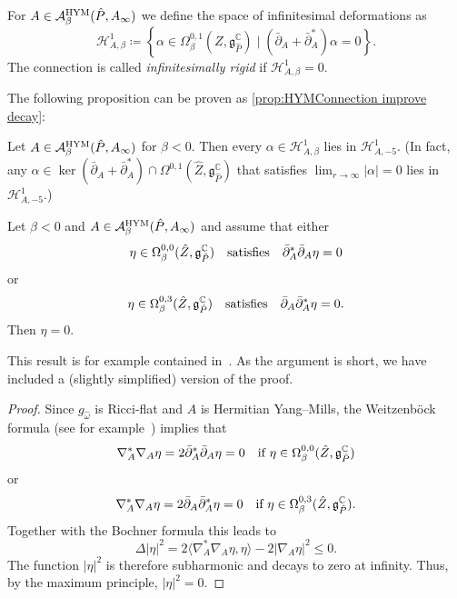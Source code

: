 \documentclass[11pt,a4paper]{scrartcl}
\newcommand{\ita}[1]{\textit{#1}}
\numberwithin{equation}{section}
\theoremstyle{plain}
\theoremstyle{definition}
\theoremstyle{remark}
\begin{document}
\begin{definition}\label{def:HYM_infinitesimal_deformations}
For $A \in \mathcal{A}^{\textup{HYM}}_\beta(\hat{P},A_\infty)$ we define the space of infinitesimal deformations as  \[\mathcal{H}^1_{A,\beta}\coloneqq \left\{\alpha\in \Omega^{0,1}_\beta(Z,\mathfrak{g}_{\hat{P}}^\mathbb{C}) \mid (\bar{\partial}_A + \bar{\partial}_A^*)\alpha=0 \right\}. \] The connection is called \ita{infinitesimally rigid} if $\mathcal{H}^1_{A,\beta} = 0$.
\end{definition}

The following proposition can be proven as \autoref{prop:HYMConnection improve decay}:
\begin{proposition}\label{prop:kernel-HYM-decay}
Let $A \in \mathcal{A}^{\textup{HYM}}_\beta(\hat{P},A_\infty)$ for $\beta<0$. Then every $\alpha \in \mathcal{H}^1_{A,\beta}$ lies in $\mathcal{H}^1_{A,-5}$. (In fact, any $\alpha \in \ker(\bar{\partial}_A+\bar{\partial}_A^*) \cap \Omega^{0,1}(\hat{Z},\mathfrak{g}_{\hat{P}}^\mathbb{C})$ that satisfies $\lim_{r\to \infty} \vert \alpha \vert = 0$ lies in $\mathcal{H}^1_{A,-5}$.)
\end{proposition}

\begin{lemma}\label{lem:delbar_harmonic_with_decay}
Let $\beta<0$ and $A\in \mathcal{A}^{\textup{HYM}}_\beta(\hat{P},A_\infty)$ and assume that either \[\eta \in \Omega^{0,0}_\beta(\hat{Z},\mathfrak{g}_{\hat{P}}^\mathbb{C})\quad \textup{satisfies} \quad\bar{\partial}_A^*\bar{\partial}_A\eta = 0\] or  \[\eta \in \Omega^{0,3}_\beta(\hat{Z},\mathfrak{g}_{\hat{P}}^\mathbb{C})\quad \textup{satisfies} \quad\bar{\partial}_A\bar{\partial}_A^*\eta = 0.\] Then $\eta =0$.
\end{lemma}
This result is for example contained in~\cite[Proof of Proposition~6.4]{WalpuskiDegeratu-HYM_on_crepant_resolutions}. As the argument is short, we have included a (slightly simplified) version of the proof.
\begin{proof}
Since $g_{\hat{\omega}}$ is Ricci-flat and $A$ is Hermitian Yang--Mills, the Weitzenböck formula (see for example~\cite[Corollary~1.1.4]{Oliveira-MonopolesDiss}) implies that \[\nabla_A^*\nabla_A \eta = 2 \bar{\partial}_A^*\bar{\partial}_A\eta = 0 \quad \textup{if $\eta \in \Omega^{0,0}_\beta(\hat{Z},\mathfrak{g}_{\hat{P}}^\mathbb{C})$}\] or \[\nabla_A^*\nabla_A \eta = 2 \bar{\partial}_A\bar{\partial}_A^*\eta = 0 \quad \textup{if $\eta \in \Omega^{0,3}_\beta(\hat{Z},\mathfrak{g}_{\hat{P}}^\mathbb{C})$}.\] Together with the Bochner formula this leads to \[ \Delta \vert \eta \vert^2 = 2 \langle \nabla_A^*\nabla_A \eta,\eta \rangle - 2 \vert \nabla_A \eta \vert^2 \leq 0. \] The function $\vert \eta \vert^2$ is therefore subharmonic and decays to zero at infinity. Thus, by the maximum principle, $\vert \eta \vert^2 = 0$.
\end{proof}
\end{document}
